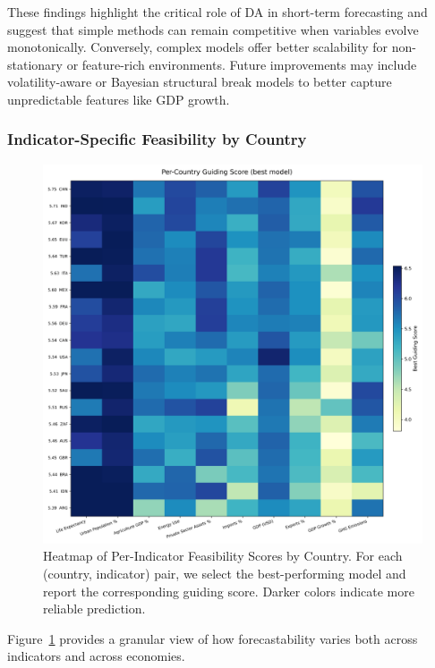 \documentclass[12pt]{article}
\begin{document}
These findings highlight the critical role of DA in short-term forecasting and suggest that simple methods can remain competitive when variables evolve monotonically. Conversely, complex models offer better scalability for non-stationary or feature-rich environments. Future improvements may include volatility-aware or Bayesian structural break models \cite{stock2002structural, Koop2013Bayesian} to better capture unpredictable features like GDP growth.


\subsubsection*{Indicator-Specific Feasibility by Country}


\begin{figure}[H]
    \centering
    \includegraphics[width=\textwidth]{heat_map.png}
    \caption{Heatmap of Per-Indicator Feasibility Scores by Country. For each (country, indicator) pair, we select the best-performing model and report the corresponding guiding score. Darker colors indicate more reliable prediction.}
    \label{fig:heatmap_feasibility}
\end{figure}


Figure~\ref{fig:heatmap_feasibility} provides a granular view of how forecastability varies both across indicators and across economies.
\end{document}
